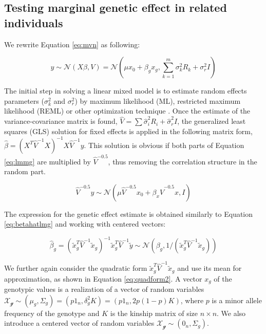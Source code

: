 \documentclass[]{book}
\theoremstyle{definition}
\theoremstyle{definition}
\theoremstyle{definition}
\theoremstyle{remark}
\begin{document}
\subsection{Testing marginal genetic effect in related
individuals}\label{lmmg}

We rewrite Equation \eqref{eq:mvn} as following:

\begin{equation} 
  y \sim \mathcal{N} (X \beta, V) = \mathcal{N} (\mu x_0 + \beta_g x_g, \sum_{k=1}^{m}{\sigma_k^2 R_k} + \sigma_r^2 I) 
\label{eq:lmmg}
\end{equation}

The initial step in solving a linear mixed model is to estimate random
effects parameters (\(\sigma_k^2\) and \(\sigma_r^2\)) by maximum
likelihood (ML), restricted maximum likelihood (REML) or other
optimization technique \citep{Lynch1998}. Once the estimate of the
variance-covariance matrix is found,
\(\hat{V} = \sum{\hat{\sigma}_i^2 R_i} + \hat{\sigma}_r^2 I\), the
generalized least squares (GLS) solution for fixed effects is applied in
the following matrix form,
\(\hat{\beta} = (X^T \hat{V}^{-1} X)^{-1} X \hat{V}^{-1} y\). This
solution is obvious if both parts of Equation \eqref{eq:lmmg} are
multiplied by \(\hat{V}^{-0.5}\), thus removing the correlation
structure in the random part.

\begin{equation} 
  \hat{V}^{-0.5} y \sim \mathcal{N} (\mu \hat{V}^{-0.5} x_0 + \beta_x \hat{V}^{-0.5} x , I)
\label{eq:lmmg2}
\end{equation}

The expression for the genetic effect estimate is obtained similarly to
Equation \eqref{eq:betahatlmg} and working with centered vectors:

\begin{equation} 
  \hat{\beta}_g  = (\tilde{x}_g^T \hat{V}^{-1} \tilde{x}_g)^{-1} \tilde{x}_g^T \hat{V}^{-1} \tilde{y} \sim \mathcal{N} (\beta_g, 1 / (\tilde{x}_g^T \hat{V}^{-1} \tilde{x}_g))
\label{eq:betahatlmmg}
\end{equation}

We further again consider the quadratic form
\(\tilde{x}_g^T \hat{V}^{-1} \tilde{x}_g\) and use its mean for
approximation, as shown in Equation \eqref{eq:quadform2}. A vector \(x_g\)
of the genotypic values is a realization of a vector of random variables
\(\mathcal{X_g} \sim (\mu_g, \Sigma_g) = (p 1_n, \delta_g^2 K) = (p 1_n, 2 p (1 - p) K)\),
where \(p\) is a minor allele frequency of the genotype and \(K\) is the
kinship matrix of size \(n \times n\). We also introduce a centered
vector of random variables \(\mathcal{X_g} \sim (0_n, \Sigma_g)\).
\end{document}
